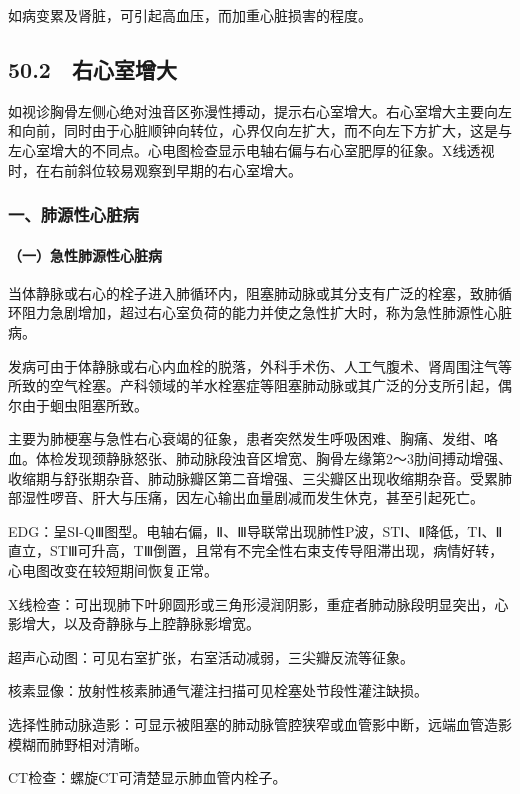 如病变累及肾脏，可引起高血压，而加重心脏损害的程度。

\protect\hypertarget{text00135.html}{}{}

\subsection{50.2　右心室增大}

如视诊胸骨左侧心绝对浊音区弥漫性搏动，提示右心室增大。右心室增大主要向左和向前，同时由于心脏顺钟向转位，心界仅向左扩大，而不向左下方扩大，这是与左心室增大的不同点。心电图检查显示电轴右偏与右心室肥厚的征象。X线透视时，在右前斜位较易观察到早期的右心室增大。

\subsubsection{一、肺源性心脏病}

\paragraph{（一）急性肺源性心脏病}

当体静脉或右心的栓子进入肺循环内，阻塞肺动脉或其分支有广泛的栓塞，致肺循环阻力急剧增加，超过右心室负荷的能力并使之急性扩大时，称为急性肺源性心脏病。

发病可由于体静脉或右心内血栓的脱落，外科手术伤、人工气腹术、肾周围注气等所致的空气栓塞。产科领域的羊水栓塞症等阻塞肺动脉或其广泛的分支所引起，偶尔由于蛔虫阻塞所致。

主要为肺梗塞与急性右心衰竭的征象，患者突然发生呼吸困难、胸痛、发绀、咯血。体检发现颈静脉怒张、肺动脉段浊音区增宽、胸骨左缘第2～3肋间搏动增强、收缩期与舒张期杂音、肺动脉瓣区第二音增强、三尖瓣区出现收缩期杂音。受累肺部湿性啰音、肝大与压痛，因左心输出血量剧减而发生休克，甚至引起死亡。

EDG：呈SⅠ-QⅢ图型。电轴右偏，Ⅱ、Ⅲ导联常出现肺性P波，STⅠ、Ⅱ降低，TⅠ、Ⅱ直立，STⅢ可升高，TⅢ倒置，且常有不完全性右束支传导阻滞出现，病情好转，心电图改变在较短期间恢复正常。

X线检查：可出现肺下叶卵圆形或三角形浸润阴影，重症者肺动脉段明显突出，心影增大，以及奇静脉与上腔静脉影增宽。

超声心动图：可见右室扩张，右室活动减弱，三尖瓣反流等征象。

核素显像：放射性核素肺通气灌注扫描可见栓塞处节段性灌注缺损。

选择性肺动脉造影：可显示被阻塞的肺动脉管腔狭窄或血管影中断，远端血管造影模糊而肺野相对清晰。

CT检查：螺旋CT可清楚显示肺血管内栓子。

